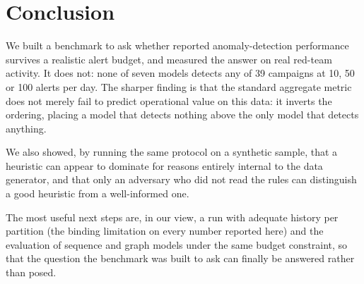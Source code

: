 \documentclass[11pt,a4paper]{article}
\begin{document}
\section{Conclusion}

We built a benchmark to ask whether reported anomaly-detection performance
survives a realistic alert budget, and measured the answer on real red-team
activity. It does not: none of seven models detects any of 39 campaigns at 10, 50
or 100 alerts per day. The sharper finding is that the standard aggregate metric
does not merely fail to predict operational value on this data: it inverts the
ordering, placing a model that detects nothing above the only model that detects
anything.

We also showed, by running the same protocol on a synthetic sample, that a
heuristic can appear to dominate for reasons entirely internal to the data
generator, and that only an adversary who did not read the rules can distinguish
a good heuristic from a well-informed one.

The most useful next steps are, in our view, a run with adequate history per
partition (the binding limitation on every number reported here) and the
evaluation of sequence and graph models under the same budget constraint, so that
the question the benchmark was built to ask can finally be answered rather than
posed.
\end{document}

